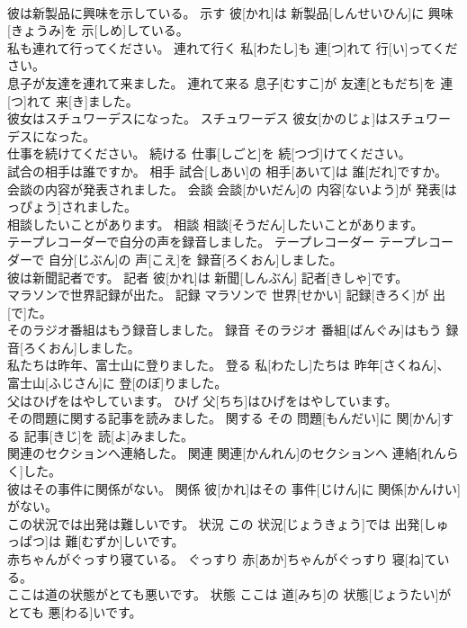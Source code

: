 \documentclass[8pt]{extreport}
\begin{document}
\begin{CJK}{UTF8}{min}
\\	彼は新製品に興味を示している。	示す	彼[かれ]は 新製品[しんせいひん]に 興味[きょうみ]を 示[しめ]している。	
\\	私も連れて行ってください。	連れて行く	私[わたし]も 連[つ]れて 行[い]ってください。	
\\	息子が友達を連れて来ました。	連れて来る	息子[むすこ]が 友達[ともだち]を 連[つ]れて 来[き]ました。	
\\	彼女はスチュワーデスになった。	スチュワーデス	彼女[かのじょ]はスチュワーデスになった。	
\\	仕事を続けてください。	続ける	仕事[しごと]を 続[つづ]けてください。	
\\	試合の相手は誰ですか。	相手	試合[しあい]の 相手[あいて]は 誰[だれ]ですか。	
\\	会談の内容が発表されました。	会談	会談[かいだん]の 内容[ないよう]が 発表[はっぴょう]されました。	
\\	相談したいことがあります。	相談	相談[そうだん]したいことがあります。	
\\	テープレコーダーで自分の声を録音しました。	テープレコーダー	テープレコーダーで 自分[じぶん]の 声[こえ]を 録音[ろくおん]しました。	
\\	彼は新聞記者です。	記者	彼[かれ]は 新聞[しんぶん] 記者[きしゃ]です。	
\\	マラソンで世界記録が出た。	記録	マラソンで 世界[せかい] 記録[きろく]が 出[で]た。	
\\	そのラジオ番組はもう録音しました。	録音	そのラジオ 番組[ばんぐみ]はもう 録音[ろくおん]しました。	
\\	私たちは昨年、富士山に登りました。	登る	私[わたし]たちは 昨年[さくねん]、 富士山[ふじさん]に 登[のぼ]りました。	
\\	父はひげをはやしています。	ひげ	父[ちち]はひげをはやしています。	
\\	その問題に関する記事を読みました。	関する	その 問題[もんだい]に 関[かん]する 記事[きじ]を 読[よ]みました。	
\\	関連のセクションへ連絡した。	関連	関連[かんれん]のセクションへ 連絡[れんらく]した。	
\\	彼はその事件に関係がない。	関係	彼[かれ]はその 事件[じけん]に 関係[かんけい]がない。	
\\	この状況では出発は難しいです。	状況	この 状況[じょうきょう]では 出発[しゅっぱつ]は 難[むずか]しいです。	
\\	赤ちゃんがぐっすり寝ている。	ぐっすり	赤[あか]ちゃんがぐっすり 寝[ね]ている。	
\\	ここは道の状態がとても悪いです。	状態	ここは 道[みち]の 状態[じょうたい]がとても 悪[わる]いです。	

\end{CJK}
\end{document}

